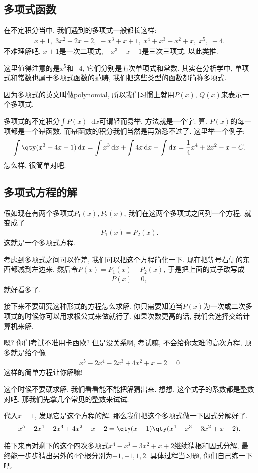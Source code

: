 \documentclass{ctexbook}
\newcommand*{\dif}{\mathop{}\!\mathrm{d}}
\begin{document}
{\subsection{多项式函数}
在不定积分当中, 我们遇到的多项式一般都长这样: 
\begin{align*}
x+1,\;3x^{2}+2x-2,\;-x^{3}+x+1,\;x^{4}+x^{3}-x^{2}+x,\;x^{5},\;-4
.\end{align*}
不难理解吧, $x+1$是一次二项式, $-x^{3}+x+1$是三次三项式, 以此类推. \par
这里值得注意的是$x^{5}$和$-4$, 它们分别是五次单项式和常数. 其实在分析学中, 单项式和常数也属于多项式函数的范畴, 我们把这些类型的函数都简称多项式. \par
因为多项式的英文叫做polynomial, 所以我们习惯上就用$P(x),\,Q(x)$来表示一个多项式. \par
多项式的不定积分$\int P(x)\dif{x}$可谓轻而易举. 方法就是一个字: 算. $P(x)$的每一项都是一个幂函数, 而幂函数的积分我们当然是再熟悉不过了. 这里举一个例子: 
\begin{align*}
\int\qty(x^{3}+4x-1)\dif{x}=\int x^{3}\dif{x}+\int4x\dif{x}-\int\dif{x}=\frac{1}{4}x^{4}+2x^{2}-x+C
.\end{align*}
怎么样, 很简单对吧. \par
\subsection{多项式方程的解}
假如现在有两个多项式$P_{1}(x),P_{2}(x)$, 我们在这两个多项式之间列一个方程, 就变成了
\begin{align*}
P_{1}(x)=P_{2}(x)
.\end{align*}
这就是一个多项式方程. \par
考虑到多项式之间可以作差, 我们可以把这个方程简化一下. 现在把等号右侧的东西都减到左边来, 然后令$P(x)=P_{1}(x)-P_{2}(x)$, 于是把上面的式子改写成
\begin{align*}
P(x)=0
,\end{align*}
就好看多了. \par
接下来不要研究这种形式的方程怎么求解. 你只需要知道当$P(x)$为一次或二次多项式的时候你可以用求根公式来做就行了. 如果次数更高的话, 我们会选择交给计算机来解. \par
嗯? 你们考试不准用卡西欧? 但是没关系啊, 考试嘛, 不会给你太难的高次方程, 顶多就是给个像
\begin{align*}
x^{5}-2x^{4}-2x^{3}+4x^{2}+x-2=0
\end{align*}
这样的简单方程让你解嘛! \par
这个时候不要硬求解, 我们看看能不能把解猜出来. 想想, 这个式子的系数都是整数对吧, 那我们先拿几个常见的整数来试试. \par
代入$x=1$, 发现它是这个方程的解. 那么我们把这个多项式做一下因式分解好了. 
\begin{align*}
x^{5}-2x^{4}-2x^{3}+4x^{2}+x-2=\qty(x-1)\qty(x^{4}-x^{3}-3x^{2}+x+2)
.\end{align*}\par
接下来再对剩下的这个四次多项式$x^{4}-x^{3}-3x^{2}+x+2$继续猜根和因式分解, 最终能一步步猜出另外的4个根分别为$-1,-1,1,2$. 具体过程当习题, 你们自己练一下吧. 
}
\end{document}
